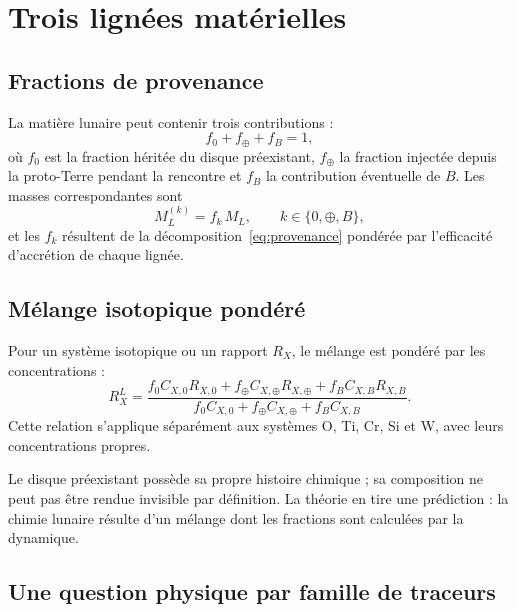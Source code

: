 \documentclass[11pt,a4paper,openany]{report}
\begin{document}
\chapter{Trois lignées matérielles}
\label{sec:geochimie}

\section{Fractions de provenance}

La matière lunaire peut contenir trois contributions :
\begin{equation}
f_0+f_\oplus+f_B=1,
\label{eq:fractions}
\end{equation}
où $f_0$ est la fraction héritée du disque préexistant, $f_\oplus$ la fraction injectée depuis la
proto-Terre pendant la rencontre et $f_B$ la contribution éventuelle de $B$. Les masses
correspondantes sont
\begin{equation}
M_L^{(k)}=f_k\,M_L,\qquad k\in\{0,\oplus,B\},
\label{eq:MLk}
\end{equation}
et les $f_k$ résultent de la décomposition~\eqref{eq:provenance} pondérée par l'efficacité
d'accrétion de chaque lignée.

\section{Mélange isotopique pondéré}

Pour un système isotopique ou un rapport $R_X$, le mélange est pondéré par les concentrations :
\begin{equation}
R_X^L=\frac{f_0C_{X,0}R_{X,0}+f_\oplus C_{X,\oplus}R_{X,\oplus}+f_BC_{X,B}R_{X,B}}
{f_0C_{X,0}+f_\oplus C_{X,\oplus}+f_BC_{X,B}}.
\label{eq:melange}
\end{equation}
Cette relation s'applique séparément aux systèmes O, Ti, Cr, Si et W, avec leurs concentrations
propres.

\begin{ideephys}
Le disque préexistant possède sa propre histoire chimique ; sa composition ne peut pas être
rendue invisible par définition. La théorie en tire une prédiction : la chimie lunaire résulte d'un
mélange dont les fractions sont calculées par la dynamique.
\end{ideephys}


\section{Une question physique par famille de traceurs}
\end{document}
